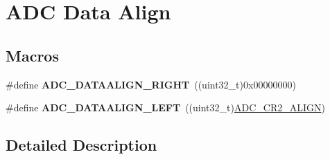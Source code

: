 \hypertarget{group___a_d_c__data__align}{}\section{A\+DC Data Align}
\label{group___a_d_c__data__align}
\subsection*{Macros}
\begin{DoxyCompactItemize}
\item 
\#define {\bfseries A\+D\+C\+\_\+\+D\+A\+T\+A\+A\+L\+I\+G\+N\+\_\+\+R\+I\+G\+HT}~((uint32\+\_\+t)0x00000000)\hypertarget{group___a_d_c__data__align_gafed5c0d327ad6d2cc0960f7943beb265}{}\label{group___a_d_c__data__align_gafed5c0d327ad6d2cc0960f7943beb265}

\item 
\#define {\bfseries A\+D\+C\+\_\+\+D\+A\+T\+A\+A\+L\+I\+G\+N\+\_\+\+L\+E\+FT}~((uint32\+\_\+t)\hyperlink{group___peripheral___registers___bits___definition_gaf5950b5a7438a447584f6dd86c343362}{A\+D\+C\+\_\+\+C\+R2\+\_\+\+A\+L\+I\+GN})\hypertarget{group___a_d_c__data__align_ga8afeead661c1ffbc27a5405a254d60ba}{}\label{group___a_d_c__data__align_ga8afeead661c1ffbc27a5405a254d60ba}

\end{DoxyCompactItemize}


\subsection{Detailed Description}
